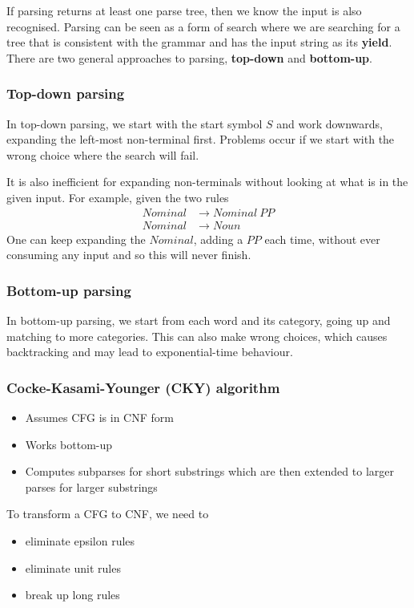 \documentclass[Report.tex]{subfiles}
\begin{document}
If parsing returns at least one parse tree, then we know the input is also
recognised. Parsing can be seen as a form of search where we are searching
for a tree that is consistent with the grammar and has the input string
as its \textbf{yield}. There are two general approaches to parsing,
\textbf{top-down} and \textbf{bottom-up}.

\subsubsection{Top-down parsing}
In top-down parsing, we start with the start symbol $S$ and work downwards,
expanding the left-most non-terminal first. Problems occur if we start with
the wrong choice where the search will fail.

It is also inefficient for expanding non-terminals without looking at what
is in the given input. For example, given the two rules
\begin{align*}
Nominal &\rightarrow Nominal\ PP \\
Nominal &\rightarrow Noun
\end{align*}
One can keep expanding the $Nominal$, adding a $PP$ each time, without ever
consuming any input and so this will never finish.

\subsubsection{Bottom-up parsing}
In bottom-up parsing, we start from each word and its category, going up and
matching to more categories. This can also make wrong choices, which causes
backtracking and may lead to exponential-time behaviour.

\subsubsection{Cocke-Kasami-Younger (CKY) algorithm}
\begin{itemize}
\item Assumes CFG is in CNF form
\item Works bottom-up
\item Computes subparses for short substrings which are then extended to
larger parses for larger substrings
\end{itemize}

To transform a CFG to CNF, we need to
\begin{itemize}
\item eliminate epsilon rules
\item eliminate unit rules
\item break up long rules
\end{itemize}
\end{document}
